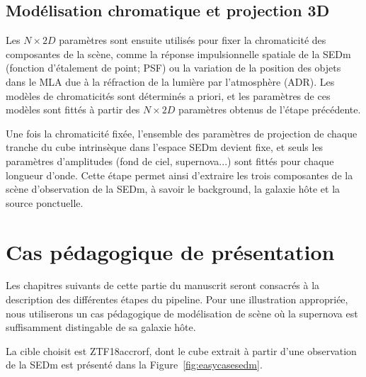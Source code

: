 \documentclass[../main/main.tex]{subfiles}
\begin{document}
\subsection{Modélisation chromatique et projection 3D}

Les $N\times2D$ paramètres sont ensuite utilisés pour fixer la chromaticité des composantes de la scène, comme la réponse impulsionnelle
spatiale de la SEDm (fonction d'étalement de point; PSF) ou la
variation de la position des objets dans le MLA due à la réfraction de
la lumière par l'atmosphère (ADR). Les modèles de chromaticités sont
déterminés a priori, et les paramètres de ces modèles sont fittés à
partir des $N\times2D$ paramètres obtenus de l'étape précédente.

Une fois la chromaticité fixée, l'ensemble des paramètres de projection de chaque tranche
du cube intrinsèque dans l'espace SEDm devient fixe, et seuls les
paramètres d'amplitudes (fond de ciel, supernova...) sont fittés pour
chaque longueur d'onde. Cette étape permet ainsi d'extraire les trois
composantes de la scène d'observation de la SEDm, à savoir le background, la galaxie hôte et la
source ponctuelle.

\section{Cas pédagogique de présentation}

Les chapitres suivants de cette partie du manuscrit seront consacrés à
la description des différentes étapes du pipeline. Pour une illustration
appropriée, nous utiliserons un cas pédagogique de modélisation de scène
où la supernova est suffisamment distingable de sa galaxie hôte.

La cible choisit est ZTF18accrorf, dont le cube extrait à partir d'une
observation de la SEDm est présenté dans la
Figure~\ref{fig:easycasesedm}.
\end{document}

